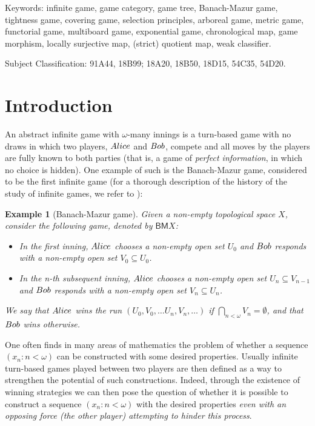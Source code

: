 \documentclass[12pt]{amsart}
\newtheorem{ex}[thm]{Example}
\theoremstyle{definition}
\newcommand{\seq}[1]{{\left( {#1} \right)}}
\newcommand{\ali}{\textup{\textmd{\textsc{Alice}}}}
\newcommand{\bob}{\textup{\textmd{\textsc{Bob}}}}
\newcommand{\BM}{\mathsf{B}\mathsf{M}}
\begin{document}
{\sc Keywords:} infinite game, game category, game tree, Banach-Mazur game, tightness game, covering game, selection principles, arboreal game, metric game, functorial game, multiboard game, exponential game, chronological map, game morphism, locally surjective map, (strict) quotient map, weak classifier.

{\sc Subject Classification:} 91A44, 18B99; 18A20, 18B50, 18D15, 54C35, 54D20.
	
	

\section{Introduction}
An abstract infinite game with $\omega$-many innings is a turn-based game with no draws in which two players, $\ali$ and $\bob$, compete and all moves by the players are fully known to both parties (that is, a game of \emph{perfect information}, in which no choice is hidden). One example of such is the Banach-Mazur game, considered to be the first infinite game (for a thorough description of the history of the study of infinite games, we refer to \cite{Telgarsky1987}):

\begin{ex}[Banach-Mazur game]\label{EX_BMGame}
	Given a non-empty topological space $X$, consider the following game, denoted by $\BM X$:
	\begin{itemize}
		\item In the first inning, $\ali$ chooses a non-empty open set $U_0$ and $\bob$ responds with a non-empty open set $V_0\subseteq U_0$.
		
		\item In the n-th subsequent inning, $\ali$ chooses a non-empty open set $U_n \subseteq V_{n-1}$ and $\bob$ responds with a non-empty open set $V_n\subseteq U_n$.
	\end{itemize} 
	We say that $\ali$ wins the run $\seq{U_0, V_0, \dotsc U_n, V_n, \dotsc}$ if $\bigcap_{n<\omega} V_n= \emptyset$, and that $\bob$ wins otherwise.	
\end{ex}

One often finds in many areas of mathematics the problem of whether a sequence $\seq{x_n:n<\omega}$ can be constructed with some desired properties. Usually infinite turn-based games played between two players are then defined as a way to strengthen the potential of such constructions. Indeed, through the existence of winning strategies we can then pose the question of whether it is possible to construct a sequence $\seq{x_n:n<\omega}$ with the desired properties \textit{even with an opposing force (the other player) attempting to hinder this process}.
\end{document}
